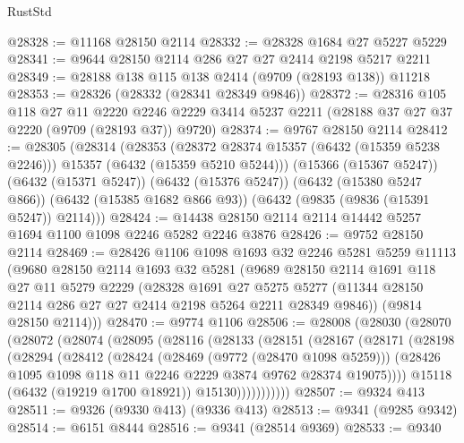 \begin{lexlean}{RustStd}
\begin{coremodule}
@28328 := @11168 @28150 @2114
@28332 := @28328 @1684 @27 @5227 @5229
@28341 := @9644 @28150 @2114 @286 @27 @27 @2414 @2198 @5217 @2211
@28349 := @28188 @138 @115 @138 @2414 (@9709 (@28193 @138)) @11218
@28353 := @28326 (@28332 (@28341 @28349 @9846))
@28372 := @28316
    @105
    @118
    @27
    @11
    @2220
    @2246
    @2229
    @3414
    @5237
    @2211
    (@28188 @37 @27 @37 @2220 (@9709 (@28193 @37)) @9720)
@28374 := @9767 @28150 @2114
@28412 := @28305
    (@28314
      (@28353
        (@28372 @28374 @15357 (@6432 (@15359 @5238 @2246)))
        @15357
        (@6432 (@15359 @5210 @5244)))
      (@15366 (@15367 @5247))
      (@6432 (@15371 @5247))
      (@6432 (@15376 @5247))
      (@6432 (@15380 @5247 @866))
      (@6432 (@15385 @1682 @866 @93))
      (@6432 (@9835 (@9836 (@15391 @5247)) @2114)))
@28424 := @14438 @28150 @2114 @2114 @14442 @5257 @1694 @1100 @1098 @2246 @5282 @2246 @3876
@28426 := @9752 @28150 @2114
@28469 := @28426
    @1106
    @1098
    @1693
    @32
    @2246
    @5281
    @5259
    @11113
    (@9680
      @28150
      @2114
      @1693
      @32
      @5281
      (@9689
        @28150
        @2114
        @1691
        @118
        @27
        @11
        @5279
        @2229
        (@28328
          @1691
          @27
          @5275
          @5277
          (@11344 @28150 @2114 @286 @27 @27 @2414 @2198 @5264 @2211 @28349 @9846))
        (@9814 @28150 @2114)))
@28470 := @9774 @1106
@28506 := @28008
    (@28030
      (@28070
        (@28072
          (@28074
            (@28095
              (@28116
                (@28133
                  (@28151
                    (@28167
                      (@28171
                        (@28198
                          (@28294
                            (@28412
                              (@28424
                                (@28469 (@9772 (@28470 @1098 @5259)))
                                (@28426
                                  @1095
                                  @1098
                                  @118
                                  @11
                                  @2246
                                  @2229
                                  @3874
                                  @9762
                                  @28374
                                  @19075))))
                          @15118
                          (@6432 (@19219 @1700 @18921))
                          @15130)))))))))))
@28507 := @9324 @413
@28511 := @9326 (@9330 @413) (@9336 @413)
@28513 := @9341 (@9285 @9342)
@28514 := @6151 @8444
@28516 := @9341 (@28514 @9369)
@28533 := @9340

\end{coremodule}
\end{lexlean}
